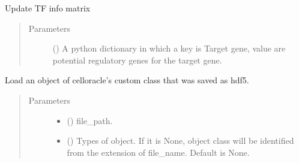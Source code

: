 \documentclass[letterpaper,10pt,english]{sphinxmanual}
\begin{document}
\begin{fulllineitems}
\begin{fulllineitems}
\begin{quote}
\begin{description}
\end{description}\end{quote}

\end{fulllineitems}


\begin{fulllineitems}
\label{\detokenize{modules/celloracle:celloracle.Net.updateTFinfo_dictionary}}
Update TF info matrix
\begin{quote}\begin{description}
\item[{Parameters}] \leavevmode
{} () \textendash{} A python dictionary in which a key is Target gene, value are potential regulatory genes for the target gene.

\end{description}\end{quote}

\end{fulllineitems}


\end{fulllineitems}


\begin{fulllineitems}
\label{\detokenize{modules/celloracle:celloracle.load_hdf5}}
Load an object of celloracle’s custom class that was saved as hdf5.
\begin{quote}\begin{description}
\item[{Parameters}] \leavevmode\begin{itemize}
\item {} 
 () \textendash{} file\_path.

\item {} 
 () \textendash{} Types of object.
If it is None, object class will be identified from the extension of file\_name.
Default is None.

\end{itemize}

\end{description}\end{quote}

\end{fulllineitems}
\end{document}

